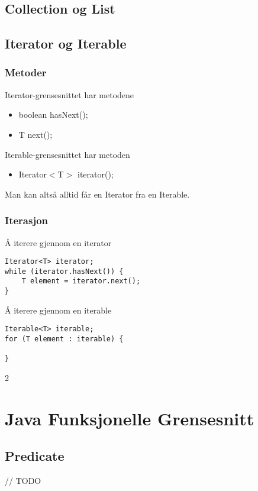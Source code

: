 \documentclass{article}
\begin{document}
\subsection{Collection og List}


\subsection{Iterator og Iterable}

\subsubsection{Metoder}
Iterator-grensesnittet har metodene
\begin{itemize}
    \item boolean hasNext();
    \item T next();
\end{itemize}
Iterable-grensesnittet har metoden
\begin{itemize}
    \item Iterator$<$T$>$ iterator();
\end{itemize}
Man kan altså alltid får en Iterator fra en Iterable.

\subsubsection{Iterasjon}

Å iterere gjennom en iterator
\begin{verbatim}
Iterator<T> iterator;
while (iterator.hasNext()) {
    T element = iterator.next();
}
\end{verbatim}
Å iterere gjennom en iterable
\begin{verbatim}
Iterable<T> iterable;
for (T element : iterable) {

}
\end{verbatim}
2
\section{Java Funksjonelle Grensesnitt}

\subsection{Predicate}
// TODO
\end{document}
